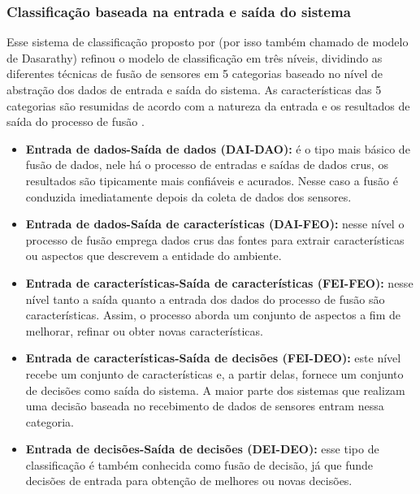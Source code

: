 \documentclass[acronym, symbols, table]{fei}
\begin{document}
			\subsubsection{Classificação baseada na entrada e saída do sistema}
			
				Esse sistema de classificação proposto por \textcite{dasarathy1997sensor} (por isso também chamado de modelo de Dasarathy) refinou o modelo de classificação em três níveis, dividindo as diferentes técnicas de fusão de sensores em 5 categorias baseado no nível de abstração dos dados de entrada e saída do sistema. As características das 5 categorias são resumidas de acordo com a natureza da entrada e os resultados de saída do processo de fusão \cite{li2021data, vakil2021survey}. 
				
				\begin{itemize}
					\item \textbf{Entrada de dados-Saída de dados (DAI-DAO):} é o tipo mais básico de fusão de dados, nele há o processo de entradas e saídas de dados crus, os resultados são tipicamente mais confiáveis e acurados. Nesse caso a fusão é conduzida imediatamente depois da coleta de dados dos sensores.
					
					\item \textbf{Entrada de dados-Saída de características (DAI-FEO):} nesse nível o processo de fusão emprega dados crus das fontes para extrair características ou aspectos que descrevem a entidade do ambiente.
					
					\item \textbf{Entrada de características-Saída de características (FEI-FEO):} nesse nível tanto a saída quanto a entrada dos dados do processo de fusão são características. Assim, o processo aborda um conjunto de aspectos a fim de melhorar, refinar ou obter novas características.
					
					\item \textbf{Entrada de características-Saída de decisões (FEI-DEO):} este nível recebe um conjunto de características e, a partir delas, fornece um conjunto de decisões como saída do sistema. A maior parte dos sistemas que realizam uma decisão baseada no recebimento de dados de sensores entram nessa categoria.
					
					\item \textbf{Entrada de decisões-Saída de decisões (DEI-DEO):} esse tipo de classificação é também conhecida como fusão de decisão, já que funde decisões de entrada para obtenção de melhores ou novas decisões.
				\end{itemize}
				
\end{document}
